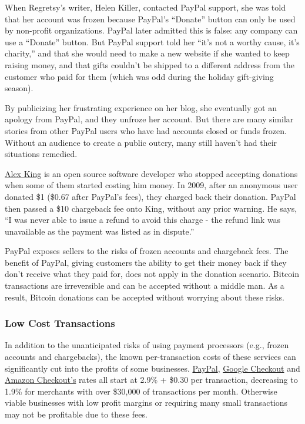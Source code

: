 \documentclass[12pt,twocolumn]{article}
\begin{document}
When Regretsy's writer, Helen Killer, contacted PayPal support, she was
told that her account was frozen because PayPal's ``Donate'' button can
only be used by non-profit organizations. PayPal later admitted this is
false: any company can use a ``Donate'' button. But PayPal support told
her ``it's not a worthy cause, it's charity,'' and that she would need
to make a new website if she wanted to keep raising money, and that
gifts couldn't be shipped to a different address from the customer who
paid for them (which was odd during the holiday gift-giving season).

By publicizing her frustrating experience on her blog, she eventually
got an apology from PayPal, and they unfroze her account. But there are
many similar stories from other PayPal users who have had accounts
closed or funds frozen. Without an audience to create a public outcry,
many still haven't had their situations remedied.

\href{http://alexking.org/blog/2009/03/23/beware-of-paypal-donation-chargebacks}{Alex
King} is an open source software developer who stopped accepting
donations when some of them started costing him money. In 2009, after an
anonymous user donated \$1 (\$0.67 after PayPal's fees), they charged
back their donation. PayPal then passed a \$10 chargeback fee onto King,
without any prior warning. He says, ``I was never able to issue a refund
to avoid this charge - the refund link was unavailable as the payment
was listed as in dispute.''

PayPal exposes sellers to the risks of frozen accounts and chargeback
fees. The benefit of PayPal, giving customers the ability to get their
money back if they don't receive what they paid for, does not apply in
the donation scenario. Bitcoin transactions are irreversible and can be
accepted without a middle man. As a result, Bitcoin donations can be
accepted without worrying about these risks.

\subsubsection{Low Cost Transactions}

In addition to the unanticipated risks of using payment processors
(e.g., frozen accounts and chargebacks), the known per-transaction costs
of these services can significantly cut into the profits of some
businesses.
\href{https://cms.paypal.com/cgi-bin/marketingweb?cmd=\_render-content\&content\_ID=merchant/merchant\_fees}{PayPal},
\href{https://checkout.google.com/seller/fees.html}{Google Checkout} and
\href{https://payments.amazon.com/sdui/sdui/business/cba#pricing}{Amazon
Checkout's} rates all start at 2.9\% + \$0.30 per transaction,
decreasing to 1.9\% for merchants with over \$30,000 of transactions per
month. Otherwise viable businesses with low profit margins or requiring
many small transactions may not be profitable due to these fees.
\end{document}
